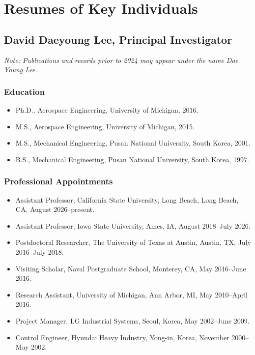 \section{Resumes of Key Individuals}

\subsection{David Daeyoung Lee, Principal Investigator}

\noindent\textit{Note: Publications and records prior to 2024 may appear under the name Dae Young Lee.}

\subsubsection{Education}

\begin{itemize}
  \item Ph.D., Aerospace Engineering, University of Michigan, 2016.
  \item M.S., Aerospace Engineering, University of Michigan, 2015.
  \item M.S., Mechanical Engineering, Pusan National University, South Korea, 2001.
  \item B.S., Mechanical Engineering, Pusan National University, South Korea, 1997.
\end{itemize}

\subsubsection{Professional Appointments}

\begin{itemize}
  \item Assistant Professor, California State University, Long Beach, Long Beach, CA, August 2026--present.
  \item Assistant Professor, Iowa State University, Ames, IA, August 2018--July 2026.
  \item Postdoctoral Researcher, The University of Texas at Austin, Austin, TX, July 2016--July 2018.
  \item Visiting Scholar, Naval Postgraduate School, Monterey, CA, May 2016--June 2016.
  \item Research Assistant, University of Michigan, Ann Arbor, MI, May 2010--April 2016.
  \item Project Manager, LG Industrial Systems, Seoul, Korea, May 2002--June 2009.
  \item Control Engineer, Hyundai Heavy Industry, Yong-in, Korea, November 2000--May 2002.
\end{itemize}


